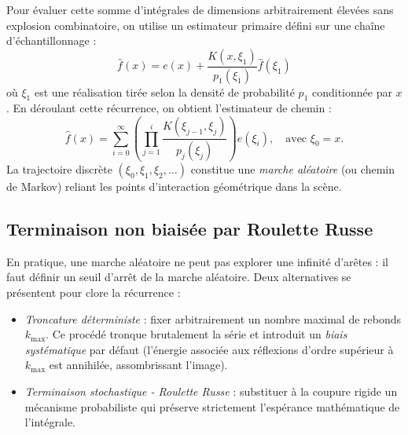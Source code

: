 Pour évaluer cette somme d'intégrales de dimensions arbitrairement élevées sans explosion combinatoire, on utilise un estimateur primaire défini sur une chaîne d'échantillonnage :
\begin{equation}
    \hat{f}(x) = e(x) + \frac{K(x, \xi_1)}{p_1(\xi_1)} \hat{f}(\xi_1)
\end{equation}
où $\xi_1$ est une réalisation tirée selon la densité de probabilité $p_1$ conditionnée par $x$. En déroulant cette récurrence, on obtient l'estimateur de chemin :
\begin{equation}
    \hat{f}(x) = \sum_{i=0}^\infty \left( \prod_{j=1}^i \frac{K(\xi_{j-1}, \xi_j)}{p_j(\xi_j)} \right) e(\xi_i), \quad \text{avec } \xi_0 = x.
\end{equation}
La trajectoire discrète $(\xi_0, \xi_1, \xi_2, \dots)$ constitue une \emph{marche aléatoire} (ou chemin de Markov) reliant les points d'interaction géométrique dans la scène.

\subsection{Terminaison non biaisée par Roulette Russe}

En pratique, une marche aléatoire ne peut pas explorer une infinité d'arêtes : il faut définir un seuil d'arrêt de la marche aléatoire. Deux alternatives se présentent pour clore la récurrence :
\begin{itemize}
    \item \emph{Troncature déterministe} : fixer arbitrairement un nombre maximal de rebonds $k_{\max}$. Ce procédé tronque brutalement la série et introduit un \emph{biais systématique} par défaut (l'énergie associée aux réflexions d'ordre supérieur à $k_{\max}$ est annihilée, assombrissant l'image).
    \item \emph{Terminaison stochastique  - Roulette Russe} : substituer à la coupure rigide un mécanisme probabiliste qui préserve strictement l'espérance mathématique de l'intégrale.
\end{itemize}

